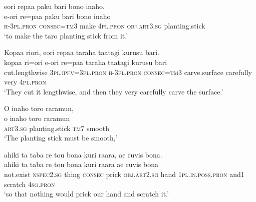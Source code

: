 \ea\label{ex:text01-182}
eori repaa paku bari bono inaho.\\
\gll e-ori	re=paa	paku	bari	bono	inaho\\
     \textsc{h}-3\textsc{pl}.\textsc{pron}	\textsc{consec}=\textsc{tm}3	make	4\textsc{pl}.\textsc{pron}	\textsc{obj}.\textsc{art}3.\textsc{sg}	planting.stick\\
\glt `to make the taro planting stick from it.'
\z

\ea\label{ex:text01-183}
Kopaa riori, eori repaa taraha taatagi kurusu bari.\\
\gll kopaa	ri=ori	e-ori	re=paa	taraha	taatagi	kurusu	bari\\
     cut.lengthwise	3\textsc{pl}.\textsc{ipfv}=3\textsc{pl}.\textsc{pron}	\textsc{h}-3\textsc{pl}.\textsc{pron}	\textsc{consec}=\textsc{tm}3	carve.surface	carefully	very	4\textsc{pl}.\textsc{pron}\\
\glt `They cut it lengthwise, and then they very carefully carve the surface.'
\z

\ea\label{ex:text01-184}
O inaho toro raramun,\\
\gll o	inaho	toro	raramun\\
     \textsc{art}3.\textsc{sg}	planting.stick	\textsc{tm}7	smooth\\
\glt `The planting stick must be smooth,'
\z

\ea\label{ex:text01-185}
ahiki ta taba re tou bona kuri raara, ae ruvis bona.\\
\gll ahiki	ta	taba	re	tou	bona	kuri	raara	ae	ruvis	bona\\
     not.exist	\textsc{nspec}2.\textsc{sg}	thing	\textsc{consec}	prick	\textsc{obj}.\textsc{art}2.\textsc{sg}	hand	1\textsc{pl}.\textsc{in}.\textsc{poss}.\textsc{pron}	and1	scratch	4\textsc{sg}.\textsc{pron}\\
\glt `so that nothing would prick our hand and scratch it.'
\z
